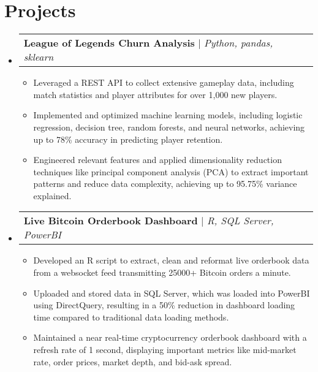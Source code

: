 \documentclass[letterpaper,11pt]{article}
\makeatletter
\newcommand{\resumeItem}[1]{
  \item\small{
    {#1 \vspace{-2pt}}
  }
}
\newcommand{\resumeSubheading}[4]{
  \vspace{-2pt}\item
    \begin{tabular*}{0.97\textwidth}[t]{l@{\extracolsep{\fill}}r}
      \textbf{#1} & #2 \\
      \textit{\small#3} & \textit{\small #4} \\
    \end{tabular*}\vspace{-7pt}
}
\newcommand{\resumeProjectHeading}[2]{
    \item
    \begin{tabular*}{0.97\textwidth}{l@{\extracolsep{\fill}}r}
      \small#1 & #2 \\
    \end{tabular*}\vspace{-7pt}
}
\newcommand{\resumeSubHeadingListStart}{\begin{itemize}[leftmargin=0.15in, label={}]}
\newcommand{\resumeSubHeadingListEnd}{\end{itemize}}
\newcommand{\resumeItemListStart}{\begin{itemize}}
\newcommand{\resumeItemListEnd}{\end{itemize}\vspace{-5pt}}
\makeatother
\begin{document}
\section{Projects}
\resumeSubHeadingListStart

  \resumeProjectHeading
  {\textbf{League of Legends Churn Analysis} $|$ \emph{Python, pandas, sklearn}}{}
  \resumeItemListStart

    \resumeItem{Leveraged a REST API to collect extensive gameplay data, 
    including match statistics and player attributes for over 1,000 new players.}
    
    \resumeItem{Implemented and optimized machine learning models, including logistic 
    regression, decision tree, random forests, and neural networks, achieving up to 78\% accuracy in predicting player retention.}
    
    \resumeItem{Engineered relevant features and applied dimensionality reduction techniques like principal component analysis 
    (PCA) to extract important patterns and reduce data complexity, achieving up to 95.75\% variance explained.}
  
  \resumeItemListEnd

  \resumeProjectHeading
  {\textbf{Live Bitcoin Orderbook Dashboard} $|$ \emph{R, SQL Server, PowerBI}}{}
  \resumeItemListStart
  
    \resumeItem{Developed an R script to extract, clean and reformat live orderbook data from a websocket 
    feed transmitting 25000+ Bitcoin orders a minute.}
        
    \resumeItem{Uploaded and stored data in SQL Server, which was loaded into PowerBI 
    using DirectQuery, resulting in a 50\% reduction in dashboard loading time compared to traditional data loading methods.}
        
        
    \resumeItem{Maintained a near real-time cryptocurrency orderbook dashboard with a refresh rate of 1 second, 
    displaying important metrics like mid-market rate, order prices, market depth, 
    and bid-ask spread.}

  \resumeItemListEnd

\resumeSubHeadingListEnd

%
\end{document}
